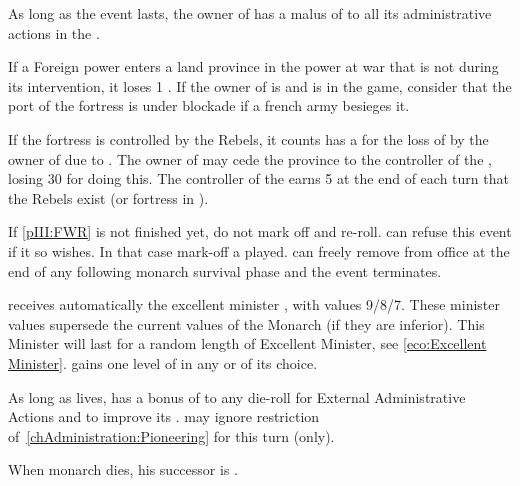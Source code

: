 \phadm
\aparag As long as the event lasts, the owner of \provincePoitou has a malus
of  to all its administrative actions in the \ROTW.

\phmil
\aparag If a Foreign power enters a land province in the power at war that is
not \provincePoitou during its intervention, it loses 1 \STAB.
\aparag If the owner of \provincePoitou is \FRA and  is in
the game, consider that the port of the fortress is under blockade if a french
army besieges it.

\phpaix
\aparag If the fortress is controlled by the Rebels, it counts has a \REVOLT
\facemoins for the loss of \STAB by the owner of \provincePoitou due to
\REVOLT .
\aparag The owner of \provincePoitou may cede the province to the controller
of the \REVOLT , losing 30 \PV for doing this.
\aparag The controller of the \REVOLT earns 5 \PV at the end of each turn that
the Rebels exist (\REVOLT or fortress in \provincePoitou).





\condition{}
\aparag If \ref{pIII:FWR} is not finished yet, do not mark off and re-roll.
\aparag \FRA can refuse this event if it so wishes. In that case mark-off a
played.
\aparag \FRA can freely remove  from office at the end of
any following monarch survival phase and the event terminates.

\phevnt
\aparag \FRA receives automatically the excellent minister
, with values 9/8/7.  These minister values supersede the
current values of the Monarch (if they are inferior). This Minister will last
for a random length of Excellent Minister, see \ref{eco:Excellent Minister}.
\aparag \FRA gains one level of \TradeFLEET in any \CTZ or \STZ of its choice.

\phadm
\aparag As long as  lives, \FRA has a bonus of 
to any die-roll for External Administrative Actions and to improve its \FTI.
\aparag \FRA may ignore restriction of~\ref{chAdministration:Pioneering} for
this turn (only).

\phinter
\aparag When \FRA monarch dies, his successor is .




